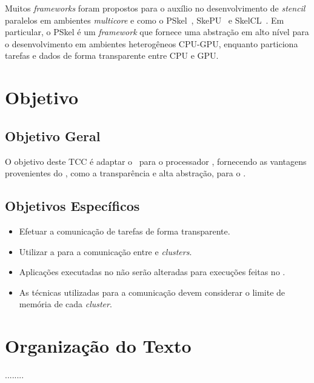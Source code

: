 Muitos \textit{frameworks} foram propostos para o auxílio no desenvolvimento de \textit{stencil} paralelos em ambientes \textit{multicore} e \gpu como o PSkel~\cite{pereira15}, SkePU~\cite{enmyren10} e SkelCL~\cite{steuwer11}. Em particular, o PSkel é um \textit{framework} que fornece uma abstração em alto nível para o desenvolvimento em ambientes heterogêneos CPU-GPU, enquanto particiona tarefas e dados de forma transparente entre CPU e GPU.

\section{Objetivo}
\subsection{Objetivo Geral}
O objetivo deste TCC é adaptar o \fw ~\pskel para o processador \mppa, fornecendo as vantagens provenientes do \fw, como a transparência e alta abstração, para o \mppa.

\subsection{Objetivos Específicos}
\begin{itemize}
	\item Efetuar a comunicação de tarefas de forma transparente.
    \item Utilizar a \noc para a comunicação entre \io e \textit{clusters}.
    \item Aplicações executadas no \fw não serão alteradas para execuções feitas no \mppa.
    \item As técnicas utilizadas para a comunicação devem considerar o limite de memória de cada \textit{cluster}.
\end{itemize}

\section{Organização do Texto}
........




